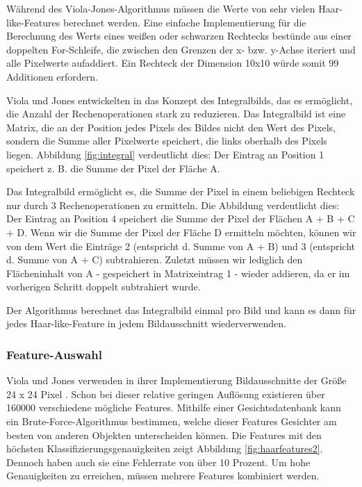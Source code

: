 \documentclass[doktyp=semarbeit, sprache=german]{TUBAFarbeiten}
\begin{document}
Während des Viola-Jones-Algorithmus müssen die Werte von sehr vielen Haar-like-Features berechnet werden. Eine einfache Implementierung für die Berechnung des Werts eines weißen oder schwarzen Rechtecks bestünde aus einer doppelten For-Schleife, die zwischen den Grenzen der x- bzw. y-Achse iteriert und alle Pixelwerte aufaddiert. Ein Rechteck der Dimension 10x10 würde somit 99 Additionen erfordern.

Viola und Jones entwickelten in \cite{Viola01rapidobject} das Konzept des Integralbilds, das es ermöglicht, die Anzahl der Rechenoperationen stark zu reduzieren. Das Integralbild ist eine Matrix, die an der Position jedes Pixels des Bildes nicht den Wert des Pixels, sondern die Summe aller Pixelwerte speichert, die links oberhalb des Pixels liegen. Abbildung \ref{fig:integral} verdeutlicht dies: Der Eintrag an Position 1 speichert z. B. die Summe der Pixel der Fläche A.

Das Integralbild ermöglicht es, die Summe der Pixel in einem beliebigen Rechteck nur durch 3 Rechenoperationen zu ermitteln. Die Abbildung verdeutlicht dies: Der Eintrag an Position 4 speichert die Summe der Pixel der Flächen A + B + C + D. Wenn wir die Summe der Pixel der Fläche D ermitteln möchten, können wir von dem Wert die Einträge 2 (entspricht d. Summe von A + B) und 3 (entspricht d. Summe von A + C) subtrahieren. Zuletzt müssen wir lediglich den Flächeninhalt von A - gespeichert in Matrixeintrag 1 - wieder addieren, da er im vorherigen Schritt doppelt subtrahiert wurde. 

Der Algorithmus berechnet das Integralbild einmal pro Bild und kann es dann für jedes Haar-like-Feature in jedem Bildausschnitt wiederverwenden.

\subsubsection{Feature-Auswahl}
Viola und Jones verwenden in ihrer Implementierung Bildausschnitte der Größe 24 x 24 Pixel \cite{Viola01rapidobject}. Schon bei dieser relative geringen Auflösung existieren über 160000 verschiedene mögliche Features. Mithilfe einer Gesichtsdatenbank kann ein Brute-Force-Algorithmus bestimmen, welche dieser Features Gesichter am besten von anderen Objekten unterscheiden können. Die Features mit den höchsten Klassifizierungsgenauigkeiten zeigt Abbildung \ref{fig:haarfeatures2}. Dennoch haben auch sie eine Fehlerrate von über 10 Prozent. Um hohe Genauigkeiten zu erreichen, müssen mehrere Features kombiniert werden.
\end{document}
